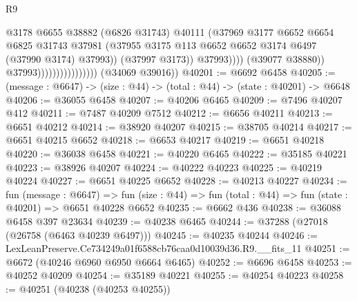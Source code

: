 \begin{lexlean}{R9}
\begin{coremodule}
                                                  @3178
                                                  @6655
                                                  @38882
                                                  (@6826 @31743)
                                                  @40111
                                                  (@37969
                                                    @3177
                                                    @6652
                                                    @6654
                                                    @6825
                                                    @31743
                                                    @37981
                                                    (@37955
                                                      @3175
                                                      @113
                                                      @6652
                                                      @6652
                                                      @3174
                                                      @6497
                                                      (@37990 @3174)
                                                      @37993))
                                                  (@37997 @3173))
                                                @37993))))
                                        (@39077 @38880))
                                      @37993))))))))))))))))
      (@34069 @39016))
@40201 := @6692 @6458
@40205 := (message : @6647) -> (size : @44) -> (total : @44) -> (state : @40201) -> @6648
@40206 := @36055 @6458
@40207 := @40206 @6465
@40209 := @7496 @40207 @412
@40211 := @7487 @40209 @7512
@40212 := @6656 @40211
@40213 := @6651 @40212
@40214 := @38920 @40207
@40215 := @38705 @40214
@40217 := @6651 @40215 @6652
@40218 := @6653 @40217
@40219 := @6651 @40218
@40220 := @36038 @6458
@40221 := @40220 @6465
@40222 := @35185 @40221
@40223 := @38926 @40207
@40224 := @40222 @40223
@40225 := @40219 @40224
@40227 := @6651 @40225 @6652
@40228 := @40213 @40227
@40234 := fun (message : @6647) =>
  fun (size : @44) => fun (total : @44) => fun (state : @40201) => @6651 @40228 @6652
@40235 := @6662 @436
@40238 := @36088 @6458 @397 @23634
@40239 := @40238 @6465
@40244 := @37288 (@27018 (@26758 (@6463 @40239 @6497)))
@40245 := @40235 @40244
@40246 := LexLeanPreserve.Ce734249a01f6588cb76caa0d10039d36.R9.__fits_11
@40251 := @6672 (@40246 @6960 @6950 @6664 @6465)
@40252 := @6696 @6458
@40253 := @40252 @40209
@40254 := @35189 @40221
@40255 := @40254 @40223
@40258 := @40251 (@40238 (@40253 @40255))

\end{coremodule}
\end{lexlean}
